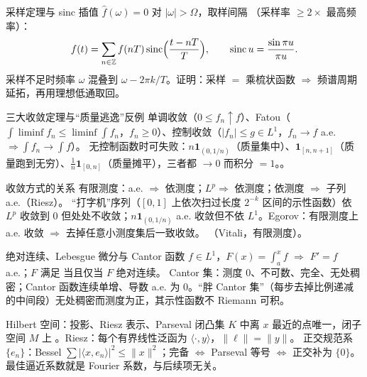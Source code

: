 \begin{结论}{采样定理与 sinc 插值}
$\hat f(\omega)=0$ 对 $|\omega|>\Omega$，取样间隔 （采样率 $\ge2\times$ 最高频率）：
\[
f(t)=\sum_{n\in\mathbb Z}f(nT)\operatorname{sinc}\Bigl(\frac{t-nT}{T}\Bigr),\qquad \operatorname{sinc}u=\frac{\sin\pi u}{\pi u}.
\]
采样不足时频率 $\omega$ 混叠到 $\omega-2\pi k/T$。证明：采样 $=$ 乘梳状函数 $\Rightarrow$ 频谱周期延拓，再用理想低通取回。
\end{结论}

\begin{结论}{三大收敛定理与“质量逃逸”反例}
单调收敛（$0\le f_n\uparrow f$）、Fatou（$\int\liminf f_n\le\liminf\int f_n$，$f_n\ge0$）、控制收敛（$|f_n|\le g\in L^1$，$f_n\to f$ a.e.$\Rightarrow\int f_n\to\int f$）。
无控制函数时可失败：$n\mathbf 1_{(0,1/n)}$（质量集中）、$\mathbf 1_{[n,n+1]}$（质量跑到无穷）、$\frac1n\mathbf 1_{[0,n]}$（质量摊平），三者都 $\to0$ 而积分 $=1$。。
\end{结论}

\begin{结论}{收敛方式的关系}
有限测度：a.e. $\Rightarrow$ 依测度；$L^p\Rightarrow$ 依测度；依测度 $\Rightarrow$ 子列 a.e.（Riesz）。
“打字机”序列（$[0,1]$ 上依次扫过长度 $2^{-k}$ 区间的示性函数）依 $L^p$ 收敛到 $0$ 但处处不收敛；$n\mathbf 1_{(0,1/n)}$ a.e. 收敛但不依 $L^1$。Egorov：有限测度上 a.e. 收敛 $\Rightarrow$ 去掉任意小测度集后一致收敛。
（Vitali，有限测度）。
\end{结论}

\begin{结论}{绝对连续、Lebesgue 微分与 Cantor 函数}
$f\in L^1$，$F(x)=\int_a^xf$ $\Rightarrow$ $F'=f$ a.e.；$F$ 满足  当且仅当 $F$ 绝对连续。
Cantor 集：测度 $0$、不可数、完全、无处稠密；Cantor 函数连续单增、导数 a.e. 为 $0$。“胖 Cantor 集”（每步去掉比例递减的中间段）无处稠密而测度为正，其示性函数不 Riemann 可积。
\end{结论}

\begin{结论}{Hilbert 空间：投影、Riesz 表示、Parseval}
闭凸集 $K$ 中离 $x$ 最近的点唯一，闭子空间 $M$ 上 。Riesz：每个有界线性泛函为 $\langle\cdot,y\rangle$，$\|\ell\|=\|y\|$。
正交规范系 $\{e_n\}$：Bessel $\sum|\langle x,e_n\rangle|^2\le\|x\|^2$；完备 $\iff$ Parseval 等号 $\iff$ 正交补为 $\{0\}$。最佳逼近系数就是 Fourier 系数，与后续项无关。
\end{结论}

